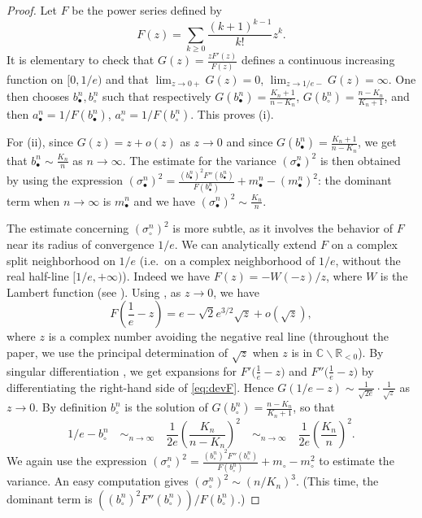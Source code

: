 \documentclass[AHL,XML,longabstracts,Unicode]{cedram}
\newcommand{\R}{\mathbb{R}}
\newcommand{\CC}{\mathbb{C}}
\def\abn{a_{\bullet}^{n}}
\def\acn{a_{\circ}^{n}}
\def\bbn{b_{\bullet}^{n}}
\def\bcn{b_{\circ}^{n}}
\def\mbn{m_{\bullet}^{n}}
\def\scn{\sigma_{\circ}^{n}}
\def\sbn{\sigma_{\bullet}^{n}}
\begin{document}
\begin{proof}Let $F$ be the power series defined by
\begin{equation}
\label{eq:F}F(z)= \sum_{k \geq 0} \frac{(k+1)^{k-1}}{k!} z^{k}.
\end{equation}
It is elementary to check that $G(z)= \frac{z F'(z)}{F(z)}$ defines a continuous increasing function on $[0,1/e)$ and that $\lim_{z \rightarrow 0+} G(z)=0$, $\lim_{z \rightarrow 1/e-} G(z)=\infty$. One then chooses $\bbn, \bcn$ such that respectively $G(\bbn)=\frac{K_{n}+1}{n-K_{n}}$, $G(\bcn)= \frac{n-K_{n}}{K_{n}+1}$, and then $\abn=1/F(\bbn)$, $\acn=1/F(\bcn)$.
This proves (i).

For (ii), since $G(z)=z+o(z)$ as $z \rightarrow 0$ and since $G(\bbn)= \frac{K_{n}+1}{n-K_{n}}$, we get that $\bbn \sim \frac{K_{n}}{n}$ as $n \rightarrow \infty$.
The estimate for the variance $(\sbn)^{2}$ is then obtained by using the expression
\hbox{$(\sbn)^{2}= \frac{(\bbn)^{2} F''(\bbn)}{F(\bbn)}+\mbn-(\mbn)^{2}$:}
the dominant term when $n  \rightarrow \infty$ is $\mbn$
and we have \hbox{$(\sbn)^{2}\sim \frac{K_{n}}{n}$}.


The estimate concerning $(\scn)^{2}$ is more subtle, as it involves the behavior of $F$ near its radius of convergence $1/e$.
We can analytically extend $F$
on a complex split neighborhood on $1/e$ (i.e.\ on a complex neighborhood of $1/e$, without the real half-line $[1/e,+\infty)$).
Indeed we have $F(z)=-W(-z)/z$, where $W$ is the Lambert function (see \cite[Eq~3.1]{CGHJK96}).
Using \cite[Eq~4.22]{CGHJK96}, as $z \rightarrow 0$, we have
\begin{equation}
\label{eq:devF}F \left( \frac{1}{e}-z \right)=e- \sqrt{2} e^{3/2} \sqrt{z}+ o(\sqrt{z}),
\end{equation}
where $z$ is a complex number avoiding the negative real line
(throughout the paper, we use the principal determination of
$\sqrt{z}$ when $z$ is in $\CC \backslash \R_{<0}$).
By singular differentiation \cite[Theorem VI.8 p. 419]{FS09},
we get expansions for $F' \big( \tfrac{1}{e}-z \big)$ and $F'' \big( \tfrac{1}{e}-z \big)$
by differentiating the right-hand side of \eqref{eq:devF}.
Hence $G(1/e-z) \sim \frac{1}{\sqrt{2e}} \cdot \frac{1}{\sqrt{z}}$ as $z \rightarrow 0$.
By definition $\bcn$ is the solution of $G(\bcn)=\tfrac{n-K_n}{K_n+1}$, so that
\begin{equation}
  1/e-\bcn  \quad \mathop{\sim}_{n \rightarrow \infty} \quad  \frac{1}{2e} \left( \frac{K_n}{n-K_n}  \right)^{2}  \quad \mathop{\sim}_{n \rightarrow \infty} \quad  \frac{1}{2e} \left( \frac{K_n}{n}  \right)^{2}.
  \label{eq:est_bcirc}
\end{equation}
We again use the expression \hbox{$(\scn)^{2}= \frac{(\bcn)^{2} F''(\bcn)}{F(\bcn)}+m_{\circ}-m_{\circ}^{2}$}
to estimate the variance.
An easy computation gives $(\scn)^{2}\sim ( {n}/{K_{n}} )^{3}$.
(This time, the dominant term is $\left({(\bcn)^{2} F''(\bcn)}\right)\big/{F(\bcn)}$.)
\end{proof}
\end{document}
